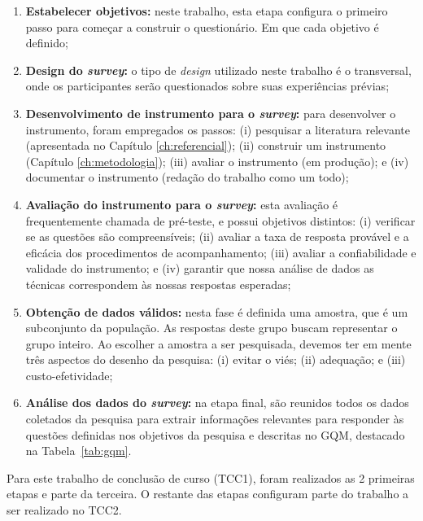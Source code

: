 \begin{enumerate} 
\item \textbf{Estabelecer objetivos:} neste trabalho, esta etapa configura o primeiro passo para começar a construir o questionário. Em que cada objetivo é definido;

\item \textbf{Design do \textit{survey}:} o tipo de \textit{design} utilizado neste trabalho é o transversal, onde os participantes serão questionados sobre suas experiências prévias;

\item \textbf{Desenvolvimento de instrumento para o \textit{survey}:} para desenvolver o instrumento, foram empregados os passos: (i) pesquisar a literatura relevante (apresentada no Capítulo \ref{ch:referencial}); (ii) construir um instrumento (Capítulo \ref{ch:metodologia}); (iii) avaliar o instrumento (em produção); e (iv) documentar o instrumento (redação do trabalho como um todo);

\item \textbf{Avaliação do instrumento para o \textit{survey}:} esta avaliação é frequentemente chamada de pré-teste, e possui objetivos distintos: (i) verificar se as questões são compreensíveis; (ii) avaliar a taxa de resposta provável e a eficácia dos procedimentos de acompanhamento; (iii) avaliar a confiabilidade e validade do instrumento; e (iv) garantir que nossa análise de dados as técnicas correspondem às nossas respostas esperadas; 

\item \textbf{Obtenção de dados válidos:} nesta fase é definida uma amostra, que é um subconjunto da população. As respostas deste grupo buscam representar o grupo inteiro. Ao escolher a amostra a ser pesquisada, devemos ter em mente três aspectos do desenho da pesquisa: (i) evitar o viés; (ii) adequação; e (iii) custo-efetividade;

\item \textbf{Análise dos dados do \textit{survey}:} na etapa final, são reunidos todos os dados coletados da pesquisa para extrair informações relevantes para responder às questões definidas nos objetivos da pesquisa e descritas no GQM, destacado na Tabela~\ref{tab:gqm}.
\end{enumerate}
 
Para este trabalho de conclusão de curso (TCC1), foram realizados as 2 primeiras etapas e parte da terceira. O restante das etapas configuram parte do trabalho a ser realizado no TCC2.

